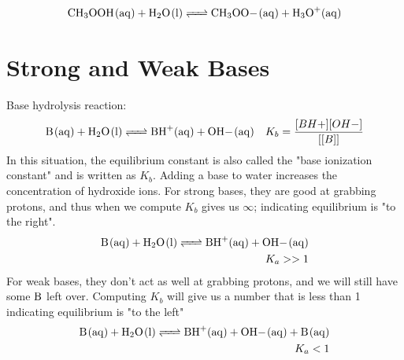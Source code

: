 \documentclass{article}  %
\begin{document}
\begin{equation*}
    \begin{aligned}
        \ce{CH3OOH_(aq) + H2O_(l) <=> CH3OO-_(aq) + H3O+_(aq)}
    \end{aligned}
\end{equation*}

\section*{Strong and Weak Bases}
Base hydrolysis reaction:
\begin{equation*}
    \begin{aligned}
        \ce{B_(aq) + H2O_(l) <=> BH+_(aq) + OH-_(aq)} \quad K_b = \frac{[BH+][OH-]}{[[B]]}
    \end{aligned}
\end{equation*}
In this situation, the equilibrium constant is also called the "base ionization constant" and is written as $K_b$.
\newline
Adding a base to water increases the concentration of hydroxide ions.
\newline
For strong bases, they are good at grabbing protons, and thus when we compute $K_b$ gives us $\infty$; indicating equilibrium is "to the right".
\begin{equation*}
    \begin{aligned}
        \ce{B_(aq) + H2O_(l) <=> BH+_(aq) + OH-_(aq)} \\
        K_a >> 1
    \end{aligned}
\end{equation*}
For weak bases, they don't act as well at grabbing protons, and we will still have some $\ce{B}$ left over. Computing $K_b$ will give us a number that is less than 1 indicating equilibrium is "to the left"
\begin{equation*}
    \begin{aligned}
        \ce{B_(aq) + H2O_(l) <=> BH+_(aq) + OH-_(aq) + B_(aq)} \\
        K_a < 1
    \end{aligned}
\end{equation*}

\end{document}
